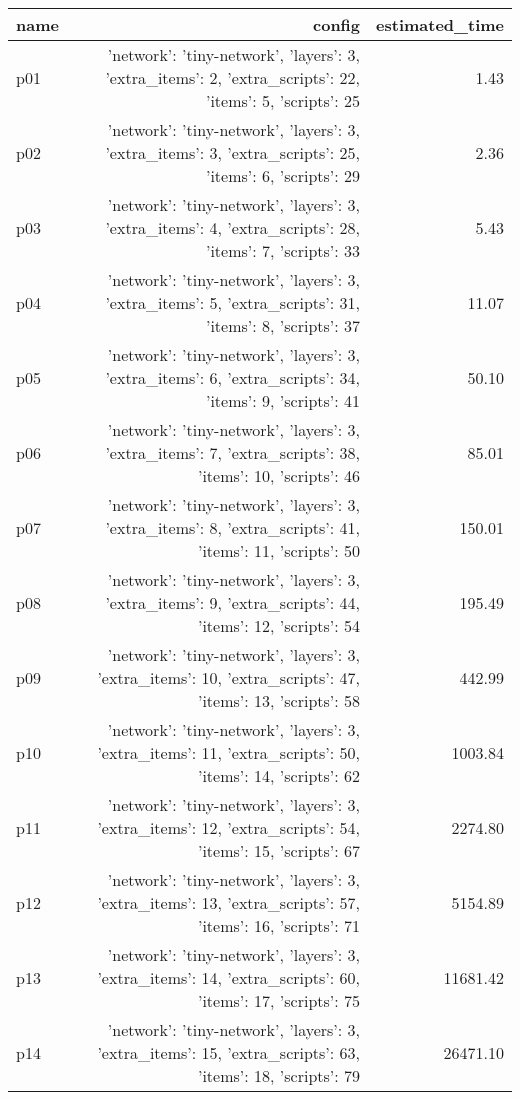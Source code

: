 \documentclass{article}
\begin{document}
                            \begin{center}
                            \scriptsize
                            \begin{tabular}{@{}l|r|r@{}}
                            name & config & estimated\_time\\\midrule
                              p01&{'network': 'tiny-network', 'layers': 3, 'extra\_items': 2, 'extra\_scripts': 22, 'items': 5, 'scripts': 25}&1.43\\
  p02&{'network': 'tiny-network', 'layers': 3, 'extra\_items': 3, 'extra\_scripts': 25, 'items': 6, 'scripts': 29}&2.36\\
  p03&{'network': 'tiny-network', 'layers': 3, 'extra\_items': 4, 'extra\_scripts': 28, 'items': 7, 'scripts': 33}&5.43\\
  p04&{'network': 'tiny-network', 'layers': 3, 'extra\_items': 5, 'extra\_scripts': 31, 'items': 8, 'scripts': 37}&11.07\\
  p05&{'network': 'tiny-network', 'layers': 3, 'extra\_items': 6, 'extra\_scripts': 34, 'items': 9, 'scripts': 41}&50.10\\
  p06&{'network': 'tiny-network', 'layers': 3, 'extra\_items': 7, 'extra\_scripts': 38, 'items': 10, 'scripts': 46}&85.01\\
  p07&{'network': 'tiny-network', 'layers': 3, 'extra\_items': 8, 'extra\_scripts': 41, 'items': 11, 'scripts': 50}&150.01\\
  p08&{'network': 'tiny-network', 'layers': 3, 'extra\_items': 9, 'extra\_scripts': 44, 'items': 12, 'scripts': 54}&195.49\\
  p09&{'network': 'tiny-network', 'layers': 3, 'extra\_items': 10, 'extra\_scripts': 47, 'items': 13, 'scripts': 58}&442.99\\
  p10&{'network': 'tiny-network', 'layers': 3, 'extra\_items': 11, 'extra\_scripts': 50, 'items': 14, 'scripts': 62}&1003.84\\
  p11&{'network': 'tiny-network', 'layers': 3, 'extra\_items': 12, 'extra\_scripts': 54, 'items': 15, 'scripts': 67}&2274.80\\
  p12&{'network': 'tiny-network', 'layers': 3, 'extra\_items': 13, 'extra\_scripts': 57, 'items': 16, 'scripts': 71}&5154.89\\
  p13&{'network': 'tiny-network', 'layers': 3, 'extra\_items': 14, 'extra\_scripts': 60, 'items': 17, 'scripts': 75}&11681.42\\
  p14&{'network': 'tiny-network', 'layers': 3, 'extra\_items': 15, 'extra\_scripts': 63, 'items': 18, 'scripts': 79}&26471.10\\

\end{tabular}
\end{center}
\end{document}
